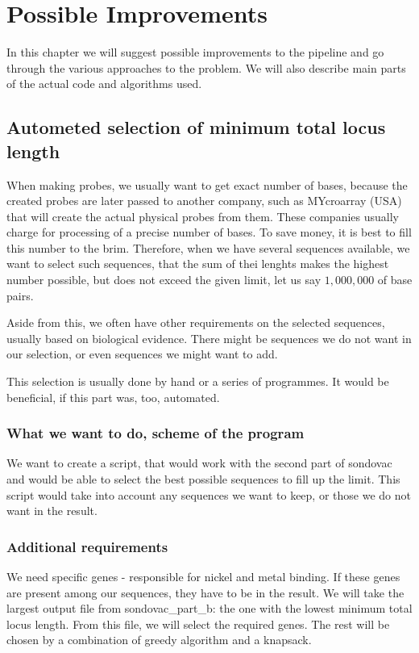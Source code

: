 \chapter[Possible Improvements]{Possible Improvements}
\label{kap:improvements}

In this chapter we will suggest possible improvements to the pipeline and go through the various approaches to the problem. 
We will also describe main parts of the actual code and algorithms used. 

\section{Autometed selection of minimum total locus length}

When making probes, we usually want to get exact number of bases, because the created probes are later passed to another 
company, such as MYcroarray (USA) \cite{mycroarray} that will create the actual physical probes from them. These companies 
usually charge for processing of a precise number of bases. To save money, it is best to fill this number to the brim. 
Therefore, when we have several sequences available, we want to select such sequences, that the sum of thei lenghts makes the 
highest number possible, but does not exceed the given limit, let us say $1,000,000$ of base pairs. 

Aside from this, we often have other requirements on the selected sequences, usually based on biological evidence. There might be 
sequences we do not want in our selection, or even sequences we might want to add. 

This selection is usually done by hand or a series of programmes. It would be beneficial, if this part was, too, automated. 

\subsection{What we want to do, scheme of the program}

We want to create a script, that would work with the second part of sondovac and would be able to select the best possible 
sequences to fill up the limit. This script would take into account any sequences we want to keep, or those we do not want in 
the result. 

\subsection{Additional requirements}
We need specific genes - responsible for nickel and metal binding. If these genes are present among our sequences, they have 
to be in the result. We will take the largest output file from sondovac\_part\_b: the one with the lowest minimum total locus length. 
From this file, we will select the required genes. The rest will be chosen by a combination of greedy algorithm and a knapsack. 


